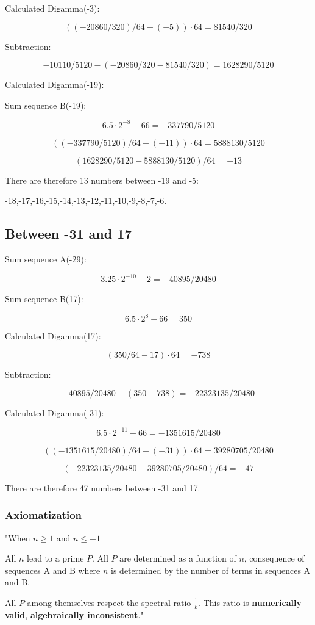 \documentclass[a4paper,11pt]{article}
\begin{document}
Calculated Digamma(-3):

\[
((-20860/320)/64 - (-5)) \cdot 64 = 81540/320
\]

Subtraction:

\[
-10110/5120 - (-20860/320 - 81540/320) = 1628290/5120
\]

Calculated Digamma(-19):

Sum sequence B(-19):

\[
6.5 \cdot 2^{-8} - 66 = -337790/5120
\]

\[
((-337790/5120)/64 - (-11)) \cdot 64 = 5888130/5120
\]

\[
(1628290/5120 - 5888130/5120)/64 = -13
\]

There are therefore 13 numbers between -19 and -5:

-18,-17,-16,-15,-14,-13,-12,-11,-10,-9,-8,-7,-6.

\subsection*{Between -31 and 17}

Sum sequence A(-29):

\[
3.25 \cdot 2^{-10} - 2 = -40895/20480
\]

Sum sequence B(17):

\[
6.5 \cdot 2^{8} - 66 = 350
\]

Calculated Digamma(17):

\[
(350/64 - 17) \cdot 64 = -738
\]

Subtraction:

\[
-40895/20480 - (350 - 738) = -22323135/20480
\]

Calculated Digamma(-31):

\[
6.5 \cdot 2^{-11} - 66 = -1351615/20480
\]

\[
((-1351615/20480)/64 - (-31)) \cdot 64 = 39280705/20480
\]

\[
(-22323135/20480 - 39280705/20480)/64 = -47
\]

There are therefore 47 numbers between -31 and 17.


\subsubsection{Axiomatization}

\begin{tcolorbox}[colback=blue!5,colframe=holblue,title={\textbf{Spectral Ratio Axiomatization}}]
"When $n \geq 1$ and $n \leq -1$

All $n$ lead to a prime $P$. All $P$ are determined as a function of $n$, consequence of sequences A and B where $n$ is determined by the number of terms in sequences A and B.

All $P$ among themselves respect the spectral ratio $\frac{1}{k}$. This ratio is \textbf{numerically valid}, \textbf{algebraically inconsistent}."
\end{tcolorbox}
\end{document}
